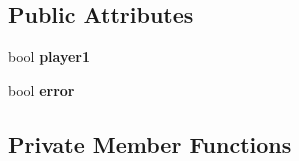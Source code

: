 \subsection*{Public Attributes}
\begin{DoxyCompactItemize}
\item 
\hypertarget{classGameGUI_ae406bf29c4d36199bc57cf421b4216f6}{bool {\bfseries player1}}\label{classGameGUI_ae406bf29c4d36199bc57cf421b4216f6}

\item 
\hypertarget{classGameGUI_a5b2ce95070adc6cb2ca2b9456e63f4e2}{bool {\bfseries error}}\label{classGameGUI_a5b2ce95070adc6cb2ca2b9456e63f4e2}

\end{DoxyCompactItemize}
\subsection*{Private Member Functions}
